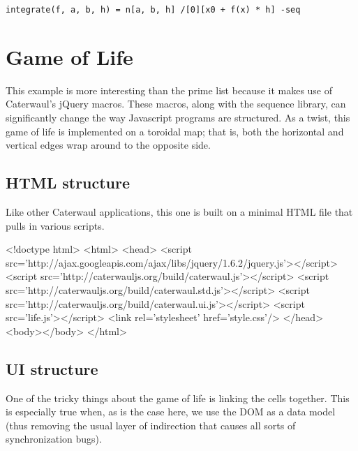 \documentclass{report}
\begin{document}
\begin{verbatim}
integrate(f, a, b, h) = n[a, b, h] /[0][x0 + f(x) * h] -seq
\end{verbatim}

\chapter{Game of Life}\label{sec:game-of-life}
  This example is more interesting than the prime list because it makes use of Caterwaul's jQuery macros. These macros, along with the sequence library, can significantly change the way
  Javascript programs are structured. As a twist, this game of life is implemented on a toroidal map; that is, both the horizontal and vertical edges wrap around to the opposite side.

\section{HTML structure}
    Like other Caterwaul applications, this one is built on a minimal HTML file that pulls in various scripts.

\begin{resourcecode}
<!doctype html>
<html>
  <head>
  <script src='http://ajax.googleapis.com/ajax/libs/jquery/1.6.2/jquery.js'></script>
  <script src='http://caterwauljs.org/build/caterwaul.js'></script>
  <script src='http://caterwauljs.org/build/caterwaul.std.js'></script>
  <script src='http://caterwauljs.org/build/caterwaul.ui.js'></script>
  <script src='life.js'></script>
  <link rel='stylesheet' href='style.css'/>
  </head>
  <body></body>
</html> \end{resourcecode}


\section{UI structure}
    One of the tricky things about the game of life is linking the cells together. This is especially true when, as is the case here, we use the DOM as a data model (thus removing the usual
    layer of indirection that causes all sorts of synchronization bugs).
\end{document}
